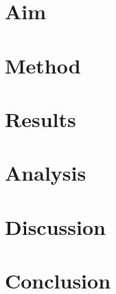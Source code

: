 \documentclass{article}
\begin{document}
\section*{Aim}
\section*{Method}
\section*{Results}
\section*{Analysis}
\section*{Discussion}
\section*{Conclusion}
\end{document}
